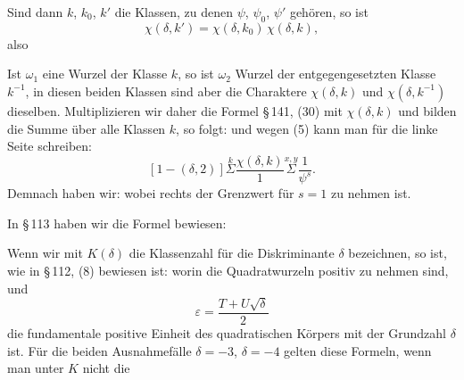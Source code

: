 Sind dann $k$, $k_0$, $k'$ die Klassen, zu denen $\psi$, $\psi_0$, $\psi'$ gehören, so ist
\[
\chi(\delta, k') = \chi(\delta, k_0)\,\chi(\delta, k),
\]
also

Ist $\omega_1$ eine Wurzel der Klasse $k$, so ist $\omega_2$ Wurzel der entgegengesetzten Klasse $k^{-1}$, in diesen beiden Klassen sind aber die Charaktere $\chi(\delta, k)$ und $\chi(\delta, k^{-1})$ dieselben. Multiplizieren wir daher die Formel \S\,141, (30) mit $\chi(\delta, k)$ und bilden die Summe über alle Klassen $k$, so folgt:
und wegen (5) kann man für die linke Seite schreiben:
\[
[1-(\delta,2)]\overset{k}{\Sigma}\frac{\chi(\delta,k)}{1}\overset{x,y}{\Sigma}\frac{1}{\psi^s}.
\]
Demnach haben wir:
wobei rechts der Grenzwert für $s=1$ zu nehmen ist.

In \S\,113 haben wir die Formel bewiesen:

Wenn wir mit $K(\delta)$ die Klassenzahl für die Diskriminante $\delta$ bezeichnen, so ist, wie in \S\,112, (8) bewiesen ist: %
worin die Quadratwurzeln positiv zu nehmen sind, und
\[
\varepsilon = \frac{T+U\sqrt{\delta}}{2}
\]
die fundamentale positive Einheit des quadratischen Körpers mit der Grundzahl $\delta$ ist. Für die beiden Ausnahmefälle $\delta=-3$, $\delta=-4$ gelten diese Formeln, wenn man unter $K$ nicht die
